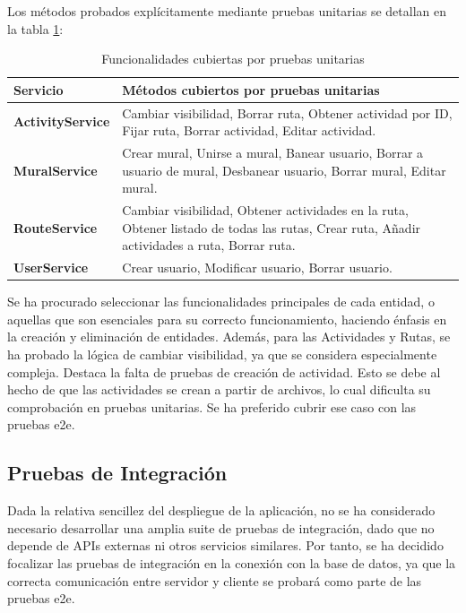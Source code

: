 Los métodos probados explícitamente mediante pruebas unitarias se detallan en la tabla \ref{pruebas_unitarias}:
\begin{table}[H]
\small
\centering
\renewcommand{\arraystretch}{0.85} %
\begin{tabularx}{\textwidth}{@{} l X @{}}
\toprule
\textbf{Servicio} & \textbf{Métodos cubiertos por pruebas unitarias} \\ \midrule
\textbf{ActivityService} & Cambiar visibilidad, Borrar ruta, Obtener actividad por ID, Fijar ruta, Borrar actividad, Editar actividad. \\ \addlinespace
\textbf{MuralService} & Crear mural, Unirse a mural, Banear usuario, Borrar a usuario de mural, Desbanear usuario, Borrar mural, Editar mural. \\ \addlinespace
\textbf{RouteService} & Cambiar visibilidad, Obtener actividades en la ruta, Obtener listado de todas las rutas, Crear ruta, Añadir actividades a ruta, Borrar ruta. \\ \addlinespace
\textbf{UserService} & Crear usuario, Modificar usuario, Borrar usuario. \\ \bottomrule
\end{tabularx}
\caption{Funcionalidades cubiertas por pruebas unitarias}
\label{pruebas_unitarias}
\end{table}
Se ha procurado seleccionar las funcionalidades principales de cada entidad, o aquellas que son esenciales para su correcto funcionamiento, haciendo énfasis en la creación y eliminación de entidades. Además, para las Actividades y Rutas, se ha probado la lógica de cambiar visibilidad, ya que se considera especialmente compleja. Destaca la falta de pruebas de creación de actividad. Esto se debe al hecho de que las actividades se crean a partir de archivos, lo cual dificulta su comprobación en pruebas unitarias. Se ha preferido cubrir ese caso con las pruebas e2e.

\subsection{Pruebas de Integración}
Dada la relativa sencillez del despliegue de la aplicación, no se ha considerado necesario desarrollar una amplia suite de pruebas de integración, dado que no depende de APIs externas ni otros servicios similares. Por tanto, se ha decidido focalizar las pruebas de integración en la conexión con la base de datos, ya que la correcta comunicación entre servidor y cliente se probará como parte de las pruebas e2e.


